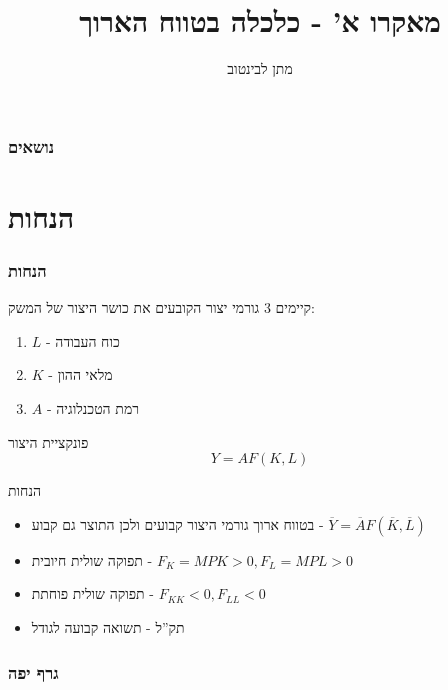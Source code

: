 \documentclass[usenames,dvipsnames,10pt]{beamer}
\title[כלכלה בטווח הארוך]{{מאקרו א' - כלכלה בטווח הארוך}}
\author{מתן לבינטוב}
\institute[{{ אב"ג}}]{{ אוניברסיטת בן גוריון בנגב}}
\date{}
\begin{document}
\begin{RTL}
\begin{frame}
\titlepage
\end{frame}
\begin{frame}
    \frametitle{נושאים}
    \tableofcontents
    

\end{frame}
\section{הנחות}
\begin{frame}[allowframebreaks]
    \frametitle{הנחות}
    קיימים 3 גורמי יצור הקובעים את כושר היצור של המשק: 
    \begin{enumerate}
        \item $L$ - כוח העבודה
        \item $K$ - מלאי ההון
        \item $A$ - רמת הטכנלוגיה
    \end{enumerate}

    \begin{block}{פונקציית היצור}
        $$Y = AF(K,L)$$
    \end{block}
    \begin{block}{הנחות}
        \begin{itemize}
            \item בטווח ארוך גורמי היצור קבועים ולכן התוצר גם קבוע - $\overline Y = \overline A F(\overline K, \overline L)$
            \item תפוקה שולית חיובית - $F_K = MPK > 0 , F_L = MPL > 0$
            \item תפוקה שולית פוחתת - $F_{KK} < 0 , F_{LL} < 0$
            \item תק''ל - תשואה קבועה לגודל
        \end{itemize}
    \end{block}
    \end{frame}

    \begin{frame}
        \frametitle{גרף יפה}
        \begin{center}
        \end{center}
    

\end{frame}
\end{RTL}
\end{document}
